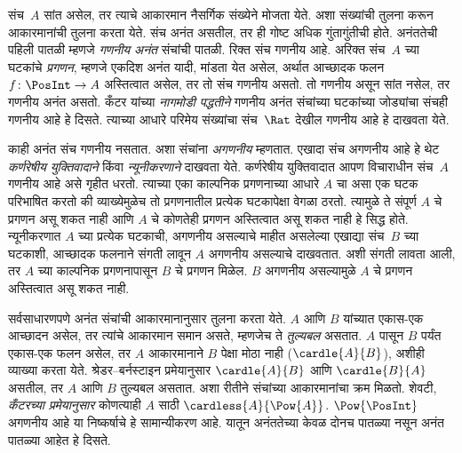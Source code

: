 संच~$A$ सांत असेल, तर त्याचे आकारमान नैसर्गिक संख्येने मोजता येते. अशा संख्यांची तुलना करून आकारमानांची तुलना करता येते. संच अनंत असतील, तर ही गोष्ट अधिक गुंतागुंतीची होते. अनंततेची पहिली पातळी म्हणजे \emph{गणनीय अनंत} संचांची पातळी. रिक्त संच गणनीय आहे. अरिक्त संच~$A$ च्या घटकांचे \emph{प्रगणन}, म्हणजे एकदिश अनंत यादी, मांडता येत असेल, अर्थात आच्छादक फलन~$f\colon \PosInt \to A$ अस्तित्वात असेल, तर तो संच गणनीय असतो. तो गणनीय असून सांत नसेल, तर गणनीय अनंत असतो. कँटर यांच्या \emph{नागमोडी पद्धतीने} गणनीय अनंत संचांच्या घटकांच्या जोड्यांचा संचही गणनीय आहे हे दिसते. त्याच्या आधारे परिमेय संख्यांचा संच~$\Rat$ देखील गणनीय आहे हे दाखवता येते.

काही अनंत संच गणनीय नसतात. अशा संचांना \emph{अगणनीय} म्हणतात. एखादा संच अगणनीय आहे हे थेट \emph{कर्णरेषीय युक्तिवादाने} किंवा \emph{न्यूनीकरणाने} दाखवता येते. कर्णरेषीय युक्तिवादात आपण विचाराधीन संच~$A$ गणनीय आहे असे गृहीत धरतो. त्याच्या एका काल्पनिक प्रगणनाच्या आधारे $A$ चा असा एक घटक परिभाषित करतो की व्याख्येमुळेच तो प्रगणनातील प्रत्येक घटकापेक्षा वेगळा ठरतो. त्यामुळे ते संपूर्ण $A$ चे प्रगणन असू शकत नाही आणि $A$ चे कोणतेही प्रगणन अस्तित्वात असू शकत नाही हे सिद्ध होते. न्यूनीकरणात $A$ च्या प्रत्येक घटकाची, अगणनीय असल्याचे माहीत असलेल्या एखाद्या संच~$B$ च्या घटकाशी, आच्छादक फलनाने संगती लावून $A$ अगणनीय असल्याचे दाखवतात. अशी संगती लावता आली, तर $A$ च्या काल्पनिक प्रगणनापासून $B$ चे प्रगणन मिळेल. $B$ अगणनीय असल्यामुळे $A$ चे प्रगणन अस्तित्वात असू शकत नाही.

सर्वसाधारणपणे अनंत संचांची आकारमानानुसार तुलना करता येते. $A$ आणि $B$ यांच्यात एकास-एक आच्छादन असेल, तर त्यांचे आकारमान समान असते, म्हणजेच ते \emph{तुल्यबल} असतात. $A$ पासून $B$ पर्यंत एकास-एक फलन असेल, तर $A$ आकारमानाने $B$ पेक्षा मोठा नाही ($\cardle{A}{B}$), अशीही व्याख्या करता येते. श्रेडर--बर्नस्टाइन प्रमेयानुसार $\cardle{A}{B}$ आणि $\cardle{B}{A}$ असतील, तर $A$ आणि $B$ तुल्यबल असतात. अशा रीतीने संचांच्या आकारमानांचा क्रम मिळतो. शेवटी, \emph{कँटरच्या प्रमेयानुसार} कोणत्याही $A$ साठी $\cardless{A}{\Pow{A}}$. $\Pow{\PosInt}$ अगणनीय आहे या निष्कर्षाचे हे सामान्यीकरण आहे. यातून अनंततेच्या केवळ दोनच पातळ्या नसून अनंत पातळ्या आहेत हे दिसते.
